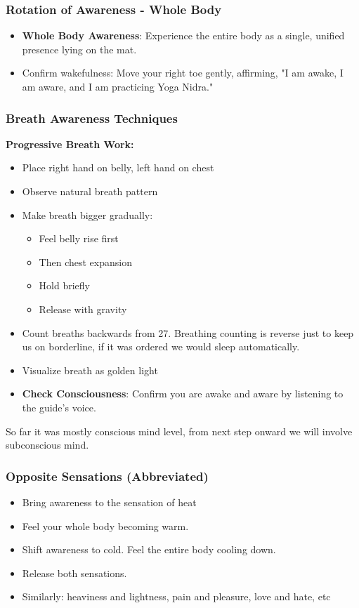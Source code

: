 \begin{frame}[fragile]\frametitle{Rotation of Awareness - Whole Body}
    \begin{itemize}
        \item \textbf{Whole Body Awareness}: Experience the entire body as a single, unified presence lying on the mat.
        \item Confirm wakefulness: Move your right toe gently, affirming, "I am awake, I am aware, and I am practicing Yoga Nidra."
    \end{itemize}
\end{frame}


\begin{frame}[fragile]\frametitle{Breath Awareness Techniques}
    \textbf{Progressive Breath Work:}
    \begin{itemize}
        \item Place right hand on belly, left hand on chest
        \item Observe natural breath pattern
        \item Make breath bigger gradually:
        \begin{itemize}
            \item Feel belly rise first
            \item Then chest expansion
            \item Hold briefly
            \item Release with gravity
        \end{itemize}
        \item Count breaths backwards from 27. Breathing counting is reverse just to keep us on borderline, if it was ordered we would sleep automatically.
        \item Visualize breath as golden light
		\item \textbf{Check Consciousness}: Confirm you are awake and aware by listening to the guide’s voice.
    \end{itemize}
	
So far it was mostly conscious mind level, from next step onward we will involve subconscious mind.	
\end{frame}

\begin{frame}[fragile]\frametitle{Opposite Sensations (Abbreviated)}
    \begin{itemize}
        \item Bring awareness to the sensation of heat
        \item Feel your whole body becoming warm.
        \item Shift awareness to cold. Feel the entire body cooling down.
        \item Release both sensations.
		\item Similarly: heaviness and lightness, pain and pleasure, love and hate, etc
    \end{itemize}
\end{frame}

